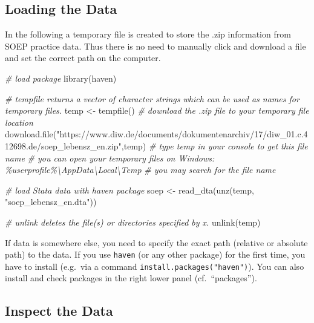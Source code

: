 \documentclass[
]{book}
\newenvironment{Shaded}{\begin{snugshade}}{\end{snugshade}}
\newcommand{\CommentTok}[1]{\textcolor[rgb]{0.56,0.35,0.01}{\textit{#1}}}
\newcommand{\FunctionTok}[1]{\textcolor[rgb]{0.00,0.00,0.00}{#1}}
\newcommand{\NormalTok}[1]{#1}
\newcommand{\OtherTok}[1]{\textcolor[rgb]{0.56,0.35,0.01}{#1}}
\newcommand{\StringTok}[1]{\textcolor[rgb]{0.31,0.60,0.02}{#1}}
\begin{document}
\hypertarget{loading-the-data}{%
\subsection{Loading the Data}\label{loading-the-data}}

In the following a temporary file is created to store the .zip information from SOEP practice data. Thus there is no need to manually click and download a file and set the correct path on the computer.

\begin{Shaded}
\begin{Highlighting}[]
\CommentTok{\# load package }
\FunctionTok{library}\NormalTok{(haven)}

\CommentTok{\# tempfile returns a vector of character strings which can be used as names for temporary files.}
\NormalTok{temp }\OtherTok{\textless{}{-}} \FunctionTok{tempfile}\NormalTok{()}
\CommentTok{\# download the .zip file to your temporary file location}
\FunctionTok{download.file}\NormalTok{(}\StringTok{"https://www.diw.de/documents/dokumentenarchiv/17/diw\_01.c.412698.de/soep\_lebensz\_en.zip"}\NormalTok{,temp)}
\CommentTok{\# type temp in your console to get this file name}
\CommentTok{\# you can open your temporary files on Windows: \%userprofile\%\textbackslash{}AppData\textbackslash{}Local\textbackslash{}Temp}
\CommentTok{\# you may search for the file name}

\CommentTok{\# load Stata data with haven package}
\NormalTok{soep }\OtherTok{\textless{}{-}} \FunctionTok{read\_dta}\NormalTok{(}\FunctionTok{unz}\NormalTok{(temp, }\StringTok{"soep\_lebensz\_en.dta"}\NormalTok{))}

\CommentTok{\# unlink deletes the file(s) or directories specified by x.}
\FunctionTok{unlink}\NormalTok{(temp)}
\end{Highlighting}
\end{Shaded}

If data is somewhere else, you need to specify the exact path (relative or absolute path) to the data. If you use \texttt{haven} (or any other package) for the first time, you have to install (e.g.~via a command \texttt{install.packages("haven")}). You can also install and check packages in the right lower panel (cf.~``packages'').

\hypertarget{inspect-the-data}{%
\subsection{Inspect the Data}\label{inspect-the-data}}
\end{document}
